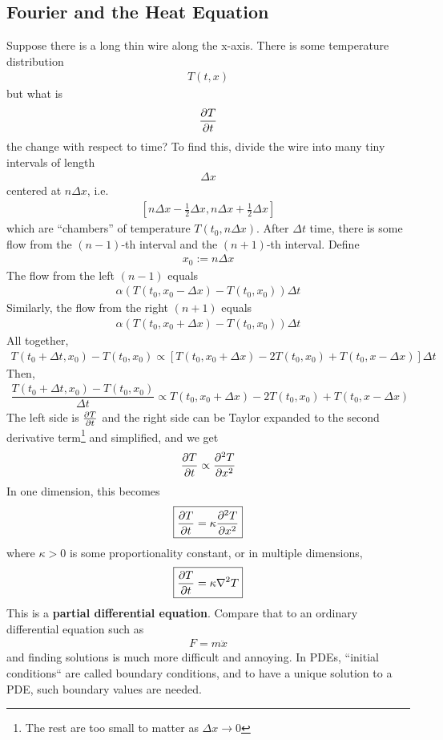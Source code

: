 \subsection{Fourier and the Heat Equation}
Suppose there is a long thin wire along the x-axis. There is some temperature distribution
\begin{align}
    T(t, x)
\end{align}
but what is
\begin{align}
    \pdv{T}{t}
\end{align}
the change with respect to time? To find this, divide the wire into many tiny intervals of length
\begin{align}
    \Delta x
\end{align}
centered at $n\Delta x$, i.e.
\begin{align}
    \left[ n\Delta x - \frac{1}{2}\Delta x, n\Delta x + \frac{1}{2}\Delta x \right]
\end{align}
which are ``chambers'' of temperature $T(t_0, n\Delta x)$. After $\Delta t$ time, there is some flow from the $(n-1)$-th interval and the $(n+1)$-th interval. Define
\begin{align}
    x_0 := n \Delta x
\end{align}
The flow from the left $(n-1)$ equals
\begin{align}
    \alpha\left( T(t_0, x_0 - \Delta x) - T(t_0, x_0) \right) \Delta t
\end{align}
Similarly, the flow from the right $(n+1)$ equals
\begin{align}
    \alpha\left( T(t_0, x_0 + \Delta x) - T(t_0, x_0) \right) \Delta t
\end{align}
All together,
\begin{align*}
    \boxed{T(t_0+\Delta t, x_0) - T(t_0, x_0) \propto \left[ T(t_0, x_0 + \Delta x) - 2T(t_0, x_0) + T(t_0, x - \Delta x) \right] \Delta t}
\end{align*}
Then,
\begin{align*}
    \dfrac{T(t_0+\Delta t, x_0) - T(t_0, x_0)}{\Delta t} \propto T(t_0, x_0 + \Delta x) - 2T(t_0, x_0) + T(t_0, x - \Delta x)
\end{align*}
The left side is $\pdv{T}{t}$ and the right side can be Taylor expanded to the second derivative term\footnote{The rest are too small to matter as $\Delta x\to 0$} and simplified, and we get
\begin{align}
    \pdv{T}{t} \propto \pdv[2]{T}{x}
\end{align}
In one dimension, this becomes
\begin{align}
    \boxed{\pdv{T}{t} = \kappa\pdv[2]{T}{x}}
\end{align}
where $\kappa > 0$ is some proportionality constant, or in multiple dimensions,
\begin{align}
    \boxed{\pdv{T}{t} = \kappa\laplacian{T}}
\end{align}
This is a \textbf{partial differential equation}. Compare that to an ordinary differential equation such as
\begin{align}
    F = m\ddot{x}
\end{align}
and finding solutions is much more difficult and annoying. In PDEs, ``initial conditions`` are called boundary conditions, and to have a unique solution to a PDE, such boundary values are needed.
